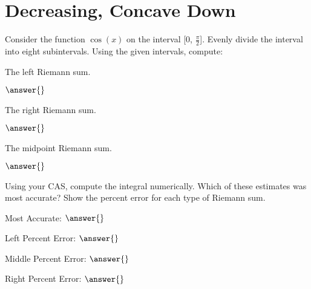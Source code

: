 \documentclass{ximera}
\begin{document}
\section{Decreasing, Concave Down}
\begin{question}
Consider the function $\cos(x)$ on the interval [0, $\frac{\pi}{2}$]. Evenly divide the interval into eight subintervals.
Using the given intervals, compute:

The left Riemann sum.

$\answer{}$

The right Riemann sum.

$\answer{}$

The midpoint Riemann sum.

$\answer{}$

Using your CAS, compute the integral numerically. Which of these estimates was most accurate? Show the percent error for each type of Riemann sum.

Most Accurate: $\answer{}$

Left Percent Error: $\answer{}$

Middle Percent Error: $\answer{}$

Right Percent Error: $\answer{}$
\end{question}
\end{document}
